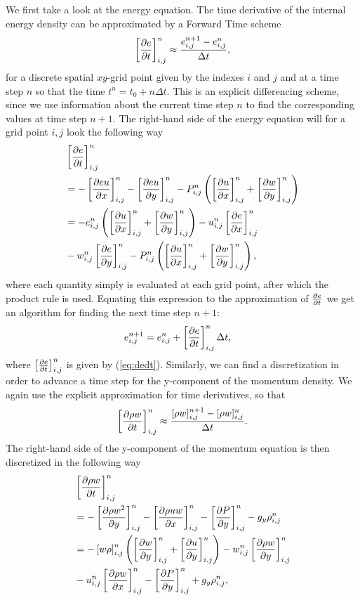 \documentclass{emulateapj}
\begin{document}
	We first take a look at the energy equation. The time derivative of the internal energy density can be approximated by a Forward Time scheme
	\begin{align}
		\left[\pdv{e}{t}\right]^n_{i,j}\approx\frac{e^{n+1}_{i, j} - e^{n}_{i, j}}{\Delta t},
	\end{align} 
	for a discrete spatial $xy$-grid point given by the indexes $i$ and $j$ and at a time step $n$ so that the time $t^n = t_0  + n\Delta t$. This is an explicit differencing scheme, since we use information about the current time step $n$ to find the corresponding values at time step $n+1$. The right-hand side of the energy equation will for a grid point $i,j$ look the following way
	\begin{align}
		&\left[\pdv{e}{t}\right]^n_{i,j} \nonumber\\
		&= -\left[\pdv{eu}{x}\right]^n_{i,j} -\left[\pdv{eu}{y}\right]^n_{i,j} - P^n_{i,j}\left(\left[\pdv{u}{x}\right]^n_{i,j} + \left[\pdv{w}{y}\right]^n_{i,j}\right)\nonumber\\
		& = -e^n_{i,j} \left(\left[\pdv{u}{x}\right]^n_{i,j} + \left[\pdv{w}{y}\right]^n_{i,j}\right) - u^n_{i,j}\left[\pdv{e}{x}\right]^n_{i,j} \nonumber\\
		&- w^n_{i,j}\left[\pdv{e}{y}\right]^n_{i,j} - P^n_{i,j}\left(\left[\pdv{u}{x}\right]^n_{i,j} + \left[\pdv{w}{y}\right]^n_{i,j}\right),
		\label{eq:dedt} 
	\end{align}
	where each quantity simply is evaluated at each grid point, after which the product rule is used.
	Equating this expression to the approximation of $\pdv{e}{t}$ we get an algorithm for finding the next time step $n + 1$:
	\begin{align}
		e^{n+1}_{i,j} &= e^n_{i,j} + \left[\pdv{e}{t}\right]^n_{i,j}\Delta t,
		\label{eq:energy_disc}
	\end{align}
	where $\left[\pdv{e}{t}\right]^n_{i,j}$ is given by (\ref{eq:dedt}).
	Similarly, we can find a discretization in order to advance a time step for the y-component of the momentum density. We again use the explicit approximation for time derivatives, so that 
	\begin{align}
		\left[\pdv{\rho w}{t}\right]^n_{i,j} \approx \frac{[\rho w]^{n+1}_{i,j} - [\rho w]^n_{i,j}}{\Delta t}.
	\end{align}
	The right-hand side of the y-component of the momentum equation is then discretized in the following way 
	\begin{align}
		&\left[\pdv{\rho w}{t}\right]^n_{i,j} \nonumber\\
		&= -\left[\pdv{\rho w^2}{y}\right]^n_{i,j} - \left[\pdv{\rho u w}{x}\right]^n_{i,j} - \left[\pdv{P}{y}\right]^n_{i,j} - g_y \rho^n_{i,j}\nonumber\\
		&= -\left[w \rho \right]^n_{i,j}\left(\left[\pdv{w}{y}\right]^n_{i,j} + \left[\pdv{u}{y}\right]^n_{i,j}\right) - w^n_{i,j}\left[\pdv{\rho w}{y}\right]^n_{i,j}\nonumber\\
		&- u^n_{i,j}\left[\pdv{\rho w}{x}\right]^n_{i,j} - \left[\pdv{P}{y}\right]^n_{i,j} + g_y\rho^n_{i,j},
		\label{eq:drhowdt} 
	\end{align}
\end{document}
